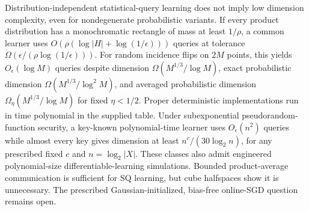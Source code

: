 Distribution-independent statistical-query learning does not imply low dimension complexity, even for nondegenerate probabilistic variants. If every product distribution has a monochromatic rectangle of mass at least $1/\rho$, a common learner uses $O(\rho(\log|H|+\log(1/\epsilon)))$ queries at tolerance $\Omega(\epsilon/(\rho\log(1/\epsilon)))$. For random incidence flips on $2M$ points, this yields $O_\epsilon(\log M)$ queries despite dimension $\Omega(M^{1/3}/\log M)$, exact probabilistic dimension $\Omega(M^{1/3}/\log^2 M)$, and averaged probabilistic dimension $\Omega_\eta(M^{1/3}/\log M)$ for fixed $\eta<1/2$. Proper deterministic implementations run in time polynomial in the supplied table. Under subexponential pseudorandom-function security, a key-known polynomial-time learner uses $O_\epsilon(n^2)$ queries while almost every key gives dimension at least $n^c/(30\log_2 n)$, for any prescribed fixed $c$ and $n=\log_2|X|$. These classes also admit engineered polynomial-size differentiable-learning simulations. Bounded product-average communication is sufficient for SQ learning, but cube halfspaces show it is unnecessary. The prescribed Gaussian-initialized, bias-free online-SGD question remains open.
